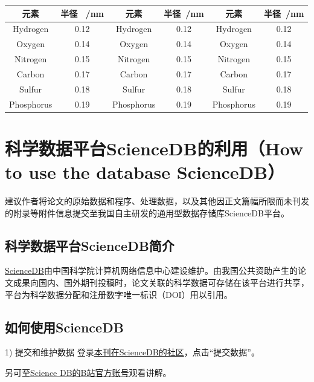 \documentclass{JQRnew}
\begin{document}
\begin{table}[h!t]
\centering
{}
\label{tablabelb}
\begin{tabular}{cccccc}
\hline
元素    & 半径 ~/nm & 元素    & 半径~/nm & 元素    & 半径~/nm \\
\hline
Hydrogen  & 0.12    & Hydrogen  & 0.12    & Hydrogen  & 0.12    \\
Oxygen   & 0.14    & Oxygen   & 0.14    & Oxygen   & 0.14    \\
Nitrogen  & 0.15    & Nitrogen  & 0.15    & Nitrogen  & 0.15    \\
Carbon   & 0.17    & Carbon   & 0.17    & Carbon   & 0.17    \\
Sulfur   & 0.18    & Sulfur   & 0.18    & Sulfur   & 0.18    \\
Phosphorus & 0.19    & Phosphorus & 0.19    & Phosphorus & 0.19    \\
\hline
\end{tabular}
\end{table}


\section{科学数据平台ScienceDB的利用（How to use the database ScienceDB）}

建议作者将论文的原始数据和程序、处理数据，以及其他因正文篇幅所限而未刊发的附录等附件信息提交至我国自主研发的通用型数据存储库ScienceDB平台。

\subsection{科学数据平台ScienceDB简介}

\href{https://www.scidb.cn/}{\color{blue}ScienceDB}由中国科学院计算机网络信息中心建设维护。由我国公共资助产生的论文成果向国内、国外期刊投稿时，论文关联的科学数据可存储在该平台进行共享，平台为科学数据分配和注册数字唯一标识（DOI）用以引用。

\subsection{如何使用ScienceDB}
1) 提交和维护数据
登录\href{https://www.scidb.cn/surl/robot}{\color{blue}本刊在ScienceDB的社区}，点击“提交数据”。

另可至\href{本刊在ScienceDB的社区}{\color{blue}Science DB的B站官方账号}观看讲解。
\end{document}
